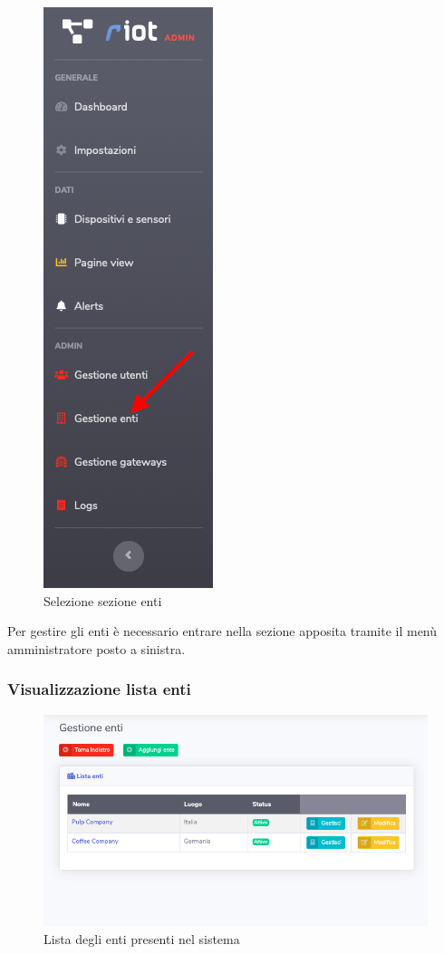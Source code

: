 		\begin{figure}[H]
		\centering
		\includegraphics[scale=0.600]{res/images/admin/menuEnti.png}
		\caption{Selezione sezione enti}
	\end{figure}

		Per gestire gli enti è necessario entrare nella sezione apposita tramite il menù amministratore posto a sinistra.

	\subsubsection{Visualizzazione lista enti}

		\begin{figure}[H]
		\centering
		\includegraphics[scale=0.600]{res/images/admin/listaEnti.png}
		\caption{Lista degli enti presenti nel sistema}
	\end{figure}

